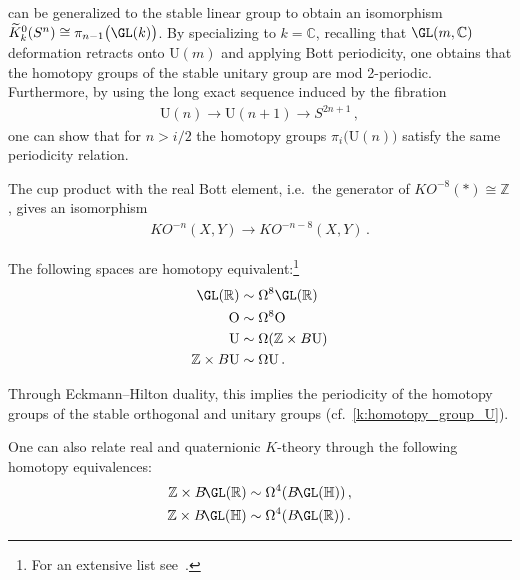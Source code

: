 {    \begin{property}\label{k:homotopy_group_U}
         can be generalized to the stable linear group to obtain an isomorphism $\widetilde{K}^0_k(S^n)\cong\pi_{n-1}\bigl(\GL(k)\bigr)$. By specializing to $k=\mathbb{C}$, recalling that $\GL(m,\mathbb{C})$ deformation retracts onto $\mathrm{U}(m)$ and applying Bott periodicity, one obtains that the homotopy groups of the stable unitary group are mod 2-periodic. Furthermore, by using the long exact sequence induced by the fibration
        \begin{gather}
            \mathrm{U}(n)\rightarrow\mathrm{U}(n+1)\rightarrow S^{2n+1}\,,
        \end{gather}
        one can show that for $n>i/2$ the homotopy groups $\pi_i\big(\mathrm{U}(n)\big)$ satisfy the same periodicity relation.
    \end{property}

    \begin{theorem}
        The cup product with the real Bott element, i.e.~the generator of $K\!O^{-8}(\ast)\cong\mathbb{Z}$, gives an isomorphism
        \begin{gather}
            K\!O^{-n}(X,Y)\rightarrow K\!O^{-n-8}(X,Y)\,.
        \end{gather}
    \end{theorem}

    \begin{theorem}
        The following spaces are homotopy equivalent:\footnote{For an extensive list see~\citet{karoubi_k-theory_1978}.}
        \begin{align}
            \GL(\mathbb{R})&\sim\Omega^8\GL(\mathbb{R})\\
            \mathrm{O}&\sim\Omega^8\mathrm{O}\\
            \mathrm{U}&\sim\Omega(\mathbb{Z}\times B\mathrm{U})\\
            \mathbb{Z}\times B\mathrm{U}&\sim\Omega\mathrm{U}\,.
        \end{align}
    \end{theorem}
    \begin{result}
        Through Eckmann--Hilton duality, this implies the periodicity of the homotopy groups of the stable orthogonal and unitary groups (cf.~\cref{k:homotopy_group_U}).
    \end{result}
    \begin{property}
        One can also relate real and quaternionic $K$-theory through the following homotopy equivalences:
        \begin{align}
            \mathbb{Z}\times B\!\GL(\mathbb{R})&\sim\Omega^4(B\!\GL(\mathbb{H}))\,,\\
            \mathbb{Z}\times B\!\GL(\mathbb{H})&\sim\Omega^4(B\!\GL(\mathbb{R}))\,.
        \end{align}
    \end{property}

}
